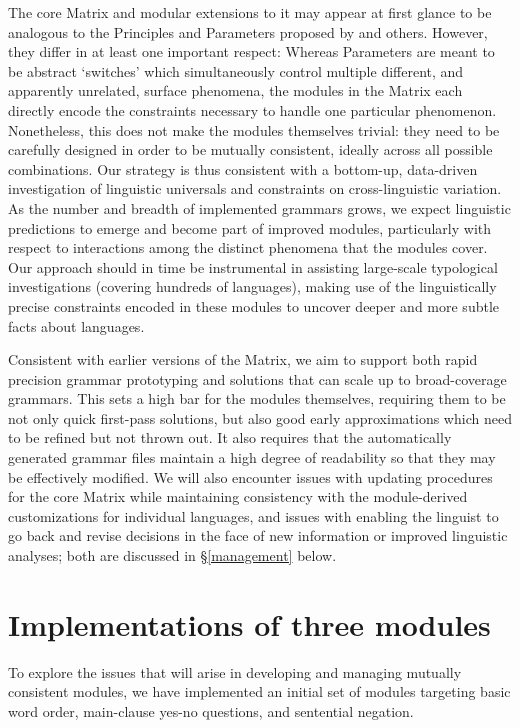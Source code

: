 The core Matrix and modular extensions to it may appear at first
glance to be analogous to the Principles and Parameters proposed
by  and others.
However, they differ in at least one important respect:
Whereas Parameters are meant to be abstract `switches'
which simultaneously control multiple different, and apparently 
unrelated, surface phenomena, the modules in the Matrix each directly
encode the constraints necessary to handle one particular phenomenon.
Nonetheless, this does not make the modules themselves trivial:
they need to be carefully designed in order to be mutually
consistent, ideally across all possible combinations.  Our strategy
is thus consistent with a
bottom-up, data-driven investigation of linguistic universals and
constraints on cross-linguistic variation.  As the number and breadth
of implemented grammars grows, we expect linguistic predictions to 
emerge and become part of improved modules, particularly with respect
to interactions among the distinct phenomena that the modules cover.
Our approach should in time be instrumental in assisting large-scale 
typological investigations (covering hundreds of languages), making use
of the linguistically precise constraints encoded in these modules to
uncover deeper and more subtle facts about languages.

Consistent with earlier versions of the Matrix, we aim to support
both rapid precision grammar prototyping and solutions that can scale up
to broad-coverage grammars. This sets a high bar for the modules themselves,
requiring them to be not only quick first-pass solutions, but also
good early approximations which need to be refined but not thrown out.
It also requires that the automatically generated grammar files 
maintain a high degree of readability so that they may be effectively
modified.  We will also encounter issues with updating procedures for
the core Matrix while maintaining consistency with the module-derived
customizations for individual languages, and issues with enabling the
linguist to go back and revise decisions in the face of new
information or improved linguistic analyses; both are discussed in
\S\ref{management} below.

\section{Implementations of three modules}
\label{imp}

To explore the issues that will arise in developing and managing
mutually consistent modules, we have
implemented an initial set of modules targeting basic
word order, main-clause yes-no questions, and sentential negation.  

